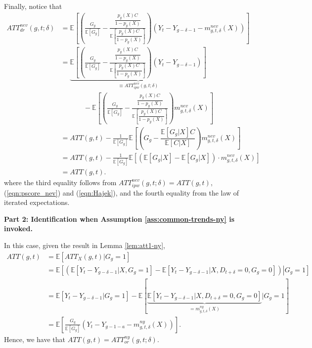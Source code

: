 \documentclass[11pt]{article}%
\theoremstyle{plain}
\numberwithin{sassumption}{section}
\numberwithin{equation}{section}
\begin{document}
{\small Finally, notice that
\begin{align*}
ATT_{dr}^{nev}\left(  g,t;\delta\right)   &  =\mathbb{E}\left[  \left(
\frac{G_{g}}{\mathbb{E}\left[  G_{g}\right]  }-\frac{\dfrac{p_{g}\left(
X\right)  C}{1-p_{g}\left(  X\right)  }}{\mathbb{E}\left[  \dfrac{p_{g}\left(
X\right)  C}{1-p_{g}\left(  X\right)  }\right]  }\right)  \left(
Y_{t}-Y_{g-\delta-1}-m_{g,t,\delta}^{nev}\left(  X\right)  \right)  \right] \\
&  =\underset{\equiv ATT_{ipw}^{nev}\left(  g,t;\delta\right)
}{\underbrace{\mathbb{E}\left[  \left(  \frac{G_{g}}{\mathbb{E}\left[
G_{g}\right]  }-\frac{\dfrac{p_{g}\left(  X\right)  C}{1-p_{g}\left(
X\right)  }}{\mathbb{E}\left[  \dfrac{p_{g}\left(  X\right)  C}{1-p_{g}\left(
X\right)  }\right]  }\right)  \left(  Y_{t}-Y_{g-\delta-1}\right)  \right]  }%
}\\
&  ~~~~~~~~~~~~~~~-\mathbb{E}\left[  \left(  \frac{G_{g}}{\mathbb{E}\left[
G_{g}\right]  }-\frac{\dfrac{p_{g}\left(  X\right)  C}{1-p_{g}\left(
X\right)  }}{\mathbb{E}\left[  \dfrac{p_{g}\left(  X\right)  C}{1-p_{g}\left(
X\right)  }\right]  }\right)  m_{g,t,\delta}^{nev}\left(  X\right)  \right] \\
&  =ATT\left(  g,t\right)  -\frac{1}{\mathbb{E}\left[  G_{g}\right]
}\mathbb{E}\left[  \left(  G_{g}-\dfrac{\mathbb{E}\left[  G_{g}|X\right]
C}{\mathbb{E}\left[  C|X\right]  }\right)  m_{g,t,\delta}^{nev}\left(
X\right)  \right] \\
&  =ATT\left(  g,t\right)  -\frac{1}{\mathbb{E}\left[  G_{g}\right]
}\mathbb{E}\left[  \left(  \mathbb{E}\left[  G_{g}|X\right]  -\mathbb{E}%
\left[  G_{g}|X\right]  \right)  \cdot m_{g,t,\delta}^{nev}\left(  X\right)
\right] \\
&  =ATT\left(  g,t\right)  .
\end{align*}
where the third equality follows from $ATT_{ipw}^{nev}\left(  g,t;\delta
\right)  =ATT\left(  g,t\right)  $, (\ref{eqn:pscore_nev}) and
(\ref{eqn:Hajek}), and the fourth equality from the law of iterated
expectations.\medskip}

{\small \textbf{Part 2: Identification when Assumption
\ref{ass:common-trends-ny} is invoked. } }

{\small In this case, given the result in Lemma \ref{lem:att1-ny},
\begin{align*}
ATT(g,t)  &  =\mathbb{E}[ATT_{X}(g,t)|G_{g}=1]\\
&  =\mathbb{E}\left[  \left.  \left(  \mathbb{E}[Y_{t}-Y_{g-\delta-1}%
|X,G_{g}=1]-\mathbb{E}[Y_{t}-Y_{g-\delta-1}|X,D_{t+\delta}=0,G_{g}=0]\right)
\right\vert G_{g}=1\right] \\
&  =\mathbb{E}[Y_{t}-Y_{g-\delta-1}|G_{g}=1]-\mathbb{E}\left[
\underset{=m_{g,t,\delta}^{ny}\left(  X\right)  }{\underbrace{\mathbb{E}%
[Y_{t}-Y_{g-\delta-1}|X,D_{t+\delta}=0,G_{g}=0]}}|G_{g}=1\right] \\
&  =\mathbb{E}\left[  \frac{G_{g}}{\mathbb{E}\left[  G_{g}\right]  }\left(
Y_{t}-Y_{g-1-a}-m_{g,t,\delta}^{ny}\left(  X\right)  \right)  \right]  .
\end{align*}
Hence, we have that $ATT(g,t)=ATT_{or}^{ny}\left(  g,t;\delta\right)  .$ }
\end{document}
